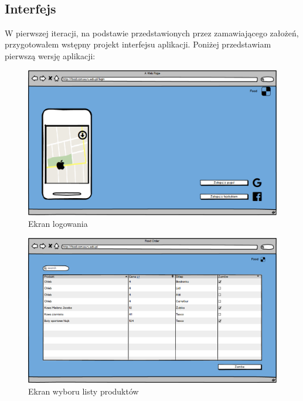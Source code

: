 \subsection{Interfejs}
W pierwszej iteracji, na podstawie przedstawionych przez zamawiającego założeń, przygotowałem wstępny projekt interfejsu aplikacji. Poniżej przedstawiam pierwszą wersję aplikacji:

\begin{figure}[H]
\centering
\includegraphics[width=15cm]{pictures/Logowanie_v0.png}
\caption{Ekran logowania}
\end{figure}

\begin{figure}[H]
\centering
\includegraphics[width=15cm]{pictures/Lista_produktow_v1.png}
\caption{Ekran wyboru listy produktów}
\end{figure}

